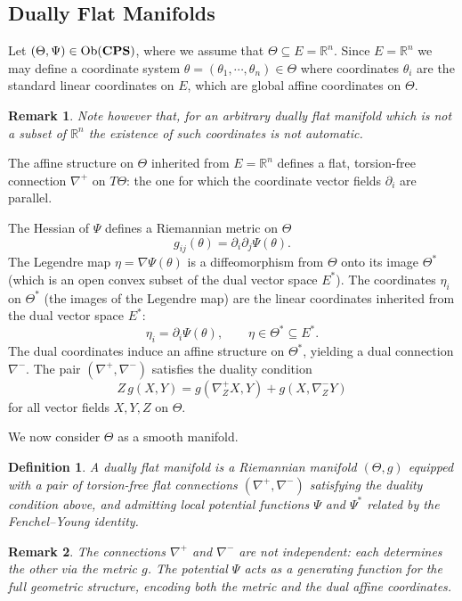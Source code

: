 \documentclass[12pt]{amsart}
\newtheorem{dfn}{Definition}
\newtheorem{remark}{Remark}
\begin{document}
\subsection{Dually Flat Manifolds}

Let $(\Theta,\Psi) \in {\rm Ob}(\mathbf{CPS})$, where we assume that $\Theta\subseteq E=\mathbb{R}^n$. Since $E=\mathbb{R}^n$ we may define a coordinate system $\theta=(\theta_1,\cdots,\theta_n)\in \Theta$ where coordinates $\theta_i$ are the standard linear coordinates on $E$, which are global affine coordinates on $\Theta$. 

\begin{remark}
    Note however that, for an arbitrary dually flat manifold which is not a subset of $\mathbb{R}^n$ the existence of such coordinates is not automatic.
\end{remark}



The affine structure on $\Theta$ inherited from $E=\mathbb{R}^n$ defines a flat, torsion-free connection $\nabla^+$ on $T\Theta$: the one for which the coordinate vector fields $\partial_i$ are parallel. 


 The Hessian of $\Psi$ defines a Riemannian metric on $\Theta$
\[
g_{ij}(\theta) = \partial_i \partial_j \Psi(\theta).
\]
The Legendre map $\eta = \nabla \Psi(\theta)$ is a diffeomorphism from $\Theta$ onto its image $\Theta^*$ (which is an open convex subset of the dual vector space $E^*$). The coordinates $\eta_i$ on $\Theta^*$ (the images of the Legendre map) are the linear coordinates inherited from the dual vector space $E^*$: \[
\eta_i = \partial_i \Psi(\theta), \qquad \eta \in \Theta^* \subseteq E^*.
\] 
 The dual coordinates induce an affine structure on $\Theta^*$, yielding a dual connection $\nabla^-$. The pair $(\nabla^+, \nabla^-)$ satisfies the duality condition
\[
Z \, g(X, Y) 
= g(\nabla^+_Z X, Y) + g(X, \nabla^-_Z Y)
\]
for all vector fields $X, Y, Z$ on $\Theta$.

We now consider $\Theta$ as a smooth manifold.
\begin{dfn}
A \emph{dually flat manifold} is a Riemannian manifold $(\Theta, g)$ equipped with a pair of torsion-free flat connections $(\nabla^+, \nabla^-)$ satisfying the duality condition above, and admitting local potential functions $\Psi$ and $\Psi^*$ related by the Fenchel--Young identity.
\end{dfn}

\begin{remark}
The connections $\nabla^+$ and $\nabla^-$ are not independent: each determines the other via the metric $g$. The potential $\Psi$ acts as a generating function for the full geometric structure, encoding both the metric and the dual affine coordinates.
\end{remark}
\end{document}
